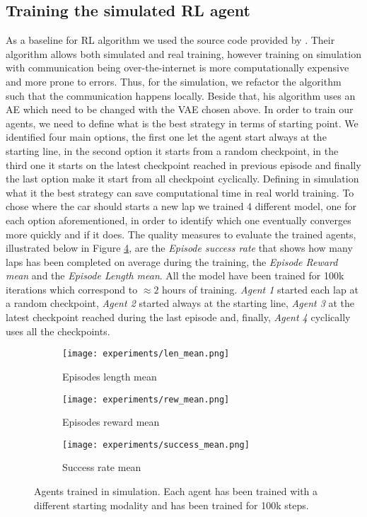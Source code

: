 \subsection{Training the simulated RL agent}
As a baseline for RL algorithm we used the source code provided by \citet{DBLP:journals/corr/abs-2008-00715}. Their algorithm allows both simulated and real training, however training on simulation with communication being over-the-internet is more computationally expensive and more prone to errors. Thus, for the simulation, we refactor the algorithm such that the communication happens locally. Beside that, his algorithm uses an AE which need to be changed with the VAE chosen above. In order to train our agents, we need to define what is the best strategy in terms of starting point. We identified four main options, the first one let the agent start always at the starting line, in the second option it starts from a random checkpoint, in the third one it starts on the latest checkpoint reached in previous episode and finally the last option make it start from all checkpoint cyclically. Defining in simulation what it the best strategy can save computational time in real world training. To chose where the car should starts a new lap we trained 4 different model, one for each option aforementioned, in order to identify which one eventually converges more quickly and if it does. The quality measures to evaluate the trained agents, illustrated below in Figure \ref{fig:agentresults}, are the \textit{Episode success rate} that shows how many laps has been completed on average during the training, the \textit{Episode Reward mean} and the \textit{Episode Length mean}. All the model have been trained for 100k iterations which correspond to $\approx 2$ hours of training. \textit{ Agent 1} started each lap at a random checkpoint,\textit{ Agent 2} started always at the starting line,\textit{ Agent 3} at the latest checkpoint reached during the last episode and, finally,\textit{ Agent 4} cyclically uses all the checkpoints.
\begin{figure}[h]
  \centering
  \begin{subfigure}{.5\linewidth}
      \centering
      \texttt{[image: experiments/len\_mean.png]}
      \caption{Episodes length mean}\label{fig:len}
  \end{subfigure}%
      \hfill
  \begin{subfigure}{.5\linewidth}
      \centering
      \texttt{[image: experiments/rew\_mean.png]}
      \caption{Episodes reward mean}\label{fig:rew}
  \end{subfigure}
  
  \bigskip
  \begin{subfigure}{.5\linewidth}
    \centering
    \texttt{[image: experiments/success\_mean.png]}
    \caption{Success rate mean}\label{fig:succ}
  \end{subfigure} 
  \caption{Agents trained in simulation. Each agent has been trained with a different starting modality and has been trained for 100k steps.}
  \label{fig:agentresults}
\end{figure}
